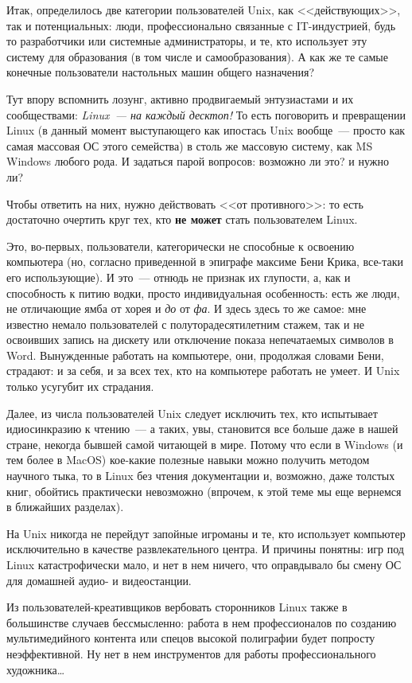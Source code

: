 Итак, определилось две категории пользователей Unix, как <<действующих>>, так и потенциальных: люди, профессионально связанные с IT-индустрией, будь то разработчики или системные администраторы, и те, кто использует эту систему для образования (в том числе и самообразования). А как же те самые конечные пользователи настольных машин общего назначения?

Тут впору вспомнить лозунг, активно продвигаемый энтузиастами и их сообществами: 
\textit{Linux~--- на каждый десктоп!}
 То есть поговорить и превращении Linux (в данный момент выступающего как ипостась Unix вообще~--- просто как самая массовая ОС этого семейства) в столь же массовую систему, как MS Windows любого рода. И задаться парой вопросов: возможно ли это? и нужно ли?

Чтобы ответить на них, нужно действовать <<от противного>>: то есть достаточно очертить круг тех, кто 
\textbf{не может}
 стать пользователем Linux.

Это, во-первых, пользователи, категорически не способные к освоению компьютера (но, согласно приведенной в эпиграфе максиме Бени Крика, все-таки его использующие). И это~--- отнюдь не признак их глупости, а, как и способность к питию водки, просто индивидуальная особенность: есть же люди, не отличающие ямба от хорея и \textit{до} от \textit{фа}. И здесь здесь то же самое: мне известно немало пользователей с полуторадесятилетним стажем, так и не освоивших запись на дискету или отключение показа непечатаемых символов в Word. Вынужденные работать на компьютере, они, продолжая словами Бени, страдают: и за себя, и за всех тех, кто на компьютере работать не умеет. И Unix только усугубит их страдания.

Далее, из числа пользователей Unix следует исключить тех, кто испытывает идиосинкразию к чтению~--- а таких, увы, становится все больше даже в нашей стране, некогда бывшей самой читающей в мире. Потому что если в Windows (и тем более в MacOS) кое-какие полезные навыки можно получить методом научного тыка, то в Linux без чтения документации и, возможно, даже толстых книг, обойтись практически невозможно (впрочем, к этой теме мы еще вернемся в ближайших разделах).

На Unix никогда не перейдут запойные игроманы и те, кто использует компьютер исключительно в качестве развлекательного центра. И причины понятны: игр под Linux катастрофически мало, и нет в нем ничего, что оправдывало бы смену ОС для домашней аудио- и видеостанции.

Из пользователей-креативщиков вербовать сторонников Linux также в большинстве случаев бессмысленно: работа в нем профессионалов по созданию мультимедийного контента или спецов высокой полиграфии будет попросту неэффективной. Ну нет в нем инструментов для работы профессионального художника\dots

